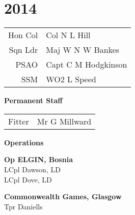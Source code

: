 \chapter*{2014}

\vspace*{20mm}

\begin{center}
  \begin{tabular}{rl}
    Hon Col & Col N L Hill \\
    Sqn Ldr & Maj W N W Bankes \\
    PSAO & Capt C M Hodgkinson \\
    SSM & WO2 L Speed \\
  \end{tabular}
\end{center}

\begin{center}
  \Large
  \textbf{Permanent Staff}
\end{center}

\begin{center}
  \begin{tabular}{rl}
    Fitter & Mr G Millward \\
  \end{tabular}
\end{center}

\vspace*{20mm}

\begin{center}
  \Large
  \textbf{Operations}
\end{center}

\begin{multicols}{2}
  \noindent
  \textbf{Op ELGIN, Bosnia} \\
  LCpl Dawson, LD \\
  LCpl Dove, LD \\
  
  \columnbreak
  
  \noindent
  \textbf{Commonwealth Games, Glasgow} \\
  Tpr Daniells \\
\end{multicols}

